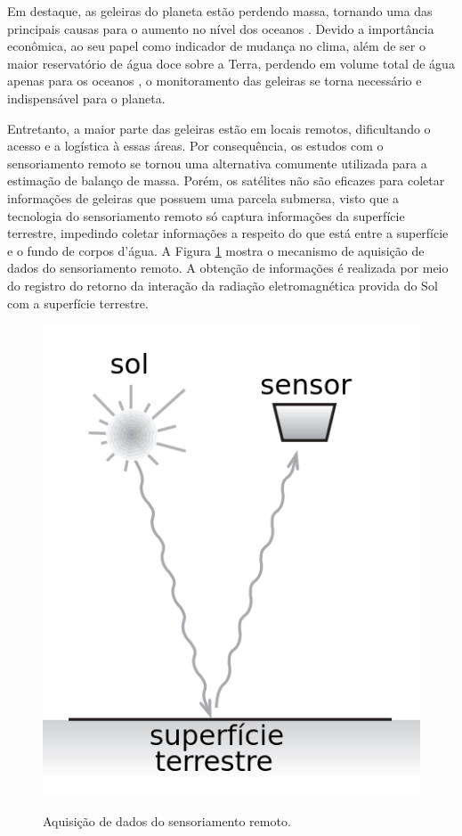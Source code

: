 Em destaque, as geleiras do planeta estão perdendo massa, tornando uma das principais causas para o aumento no nível dos oceanos \cite{rietbroek2016revisiting}. Devido a importância econômica, ao seu papel como indicador de mudança no clima, além de ser o maior reservatório de água doce sobre a Terra, perdendo em volume total de água apenas para os oceanos \cite{pinto2015crise}, o monitoramento das geleiras se torna necessário e indispensável para o planeta.

Entretanto, a maior parte das geleiras estão em locais remotos, dificultando o acesso e a logística à essas áreas. Por consequência, os estudos com o sensoriamento remoto se tornou uma alternativa comumente utilizada para a estimação de balanço de massa. Porém, os satélites não são eficazes para coletar informações de geleiras que possuem uma parcela submersa, visto que a tecnologia do sensoriamento remoto só captura informações da superfície terrestre, impedindo coletar informações a respeito do que está entre a superfície e o fundo de corpos d'água. 
A Figura \ref{fig:remote_sensor} mostra o mecanismo de aquisição de dados do sensoriamento remoto. A obtenção de informações é realizada por meio do registro do retorno da interação da radiação eletromagnética provida do Sol com a superfície terrestre. 

\begin{figure}[H]
    \centering
    \caption{Aquisição de dados do sensoriamento remoto.}
    \includegraphics[scale=0.5]{dados/figuras/remote_sensor.png}
    \label{fig:remote_sensor}
\end{figure}


